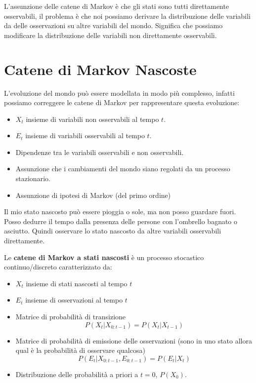 L'assunzione delle catene di Markov è che gli stati sono tutti direttamente osservabili,
il problema è che noi possiamo derivare la distribuzione delle variabili da delle
osservazioni su altre variabili del mondo. Significa che possiamo modificare la
distribuzione delle variabili non direttamente osservabili.
\section{Catene di Markov Nascoste}
L'evoluzione del mondo può essere modellata in modo più complesso, infatti possiamo
correggere le catene di Markov per rappresentare questa evoluzione:
\begin{itemize}
    \item $X_t$ insieme di variabili non osservabili al tempo $t$.
    \item $E_t$ insieme di variabili osservabili al tempo $t$.
    \item Dipendenze tra le variabili osservabili e non osservabili.
    \item Assunzione che i cambiamenti del mondo siano regolati da un processo
          stazionario.
    \item Assunzione di ipotesi di Markov (del primo ordine)
\end{itemize}
\begin{esempio}
    Il mio stato nascosto può essere pioggia o sole, ma non posso guardare fuori.
    Posso dedurre il tempo dalla presenza delle persone con l'ombrello bagnato o
    asciutto. Quindi osservare lo stato nascosto da altre variabili osservabili
    direttamente.
\end{esempio}
\begin{definizione}
    Le \textbf{catene di Markov a stati nascosti} è un processo stocastico
    continuo/discreto caratterizzato da:
    \begin{itemize}
        \item $X_t$ insieme di stati nascosti al tempo $t$
        \item $E_t$ insieme di osservazioni al tempo $t$
        \item Matrice di probabilità di transizione
              \begin{equation*}
                  P(X_t | X_{0:t-1}) = P(X_t | X_{t-1})
              \end{equation*}
        \item Matrice di probabilità di emissione delle osservazioni (sono in uno
              stato allora qual è la probabilità di osservare qualcosa)
              \begin{equation*}
                  P(E_t | X_{0:t-1}, E_{0:t-1}) = P(E_t | X_{t})
              \end{equation*}
        \item Distribuzione delle probabilità a priori a $t=0$, $P(X_0)$.
    \end{itemize}
\end{definizione}

